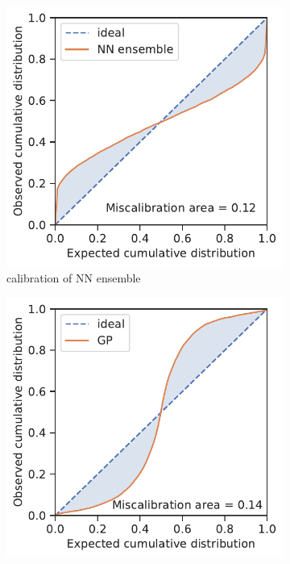 \documentclass[]{achemso}
\begin{document}
\begin{figure}
    \centering
    \begin{subfigure}[b]{0.32\textwidth}
        \includegraphics[width=\textwidth]{../NN_ensemble/calibration.pdf}
        \caption{calibration of \gls{NN} ensemble}\label{fig:calibration_example_ensemble}
    \end{subfigure}
    \begin{subfigure}[b]{0.32\textwidth}
        \includegraphics[width=\textwidth]{../GP/Matern/calibration.pdf}

\end{subfigure}
\end{figure}
\end{document}
